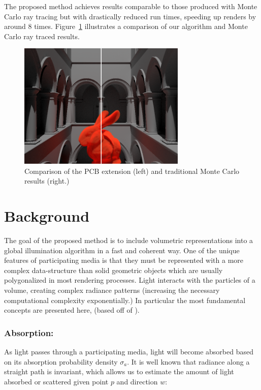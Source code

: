 \documentclass[runningheads]{llncs}
\begin{document}
  The proposed method achieves results comparable to those produced with Monte Carlo ray tracing but with drastically reduced run times, speeding up renders by around 8 times.  Figure~\ref{fig:compare} illustrates a comparison of our algorithm and Monte Carlo ray traced results.

\begin{figure}[h!]
    \centering
    \includegraphics[width=80mm]{img/compare.png}
    \caption{Comparison of the PCB extension (left) and traditional Monte Carlo results (right.)}
    \label{fig:compare}
\end{figure}


\section{Background}
\label{background_sec}
The goal of the proposed method is to include volumetric representations into a global illumination algorithm in a fast and coherent way. One of the unique features of participating media is that they must be represented with a more complex data-structure than solid geometric objects which are usually polygonalized in most rendering processes.  Light interacts with the particles of a volume, creating complex radiance patterns (increasing the necessary computational complexity exponentially.) In particular the most fundamental concepts are presented here,  (based off of  \cite{pbrt}).

\subsubsection{Absorption:}
As light passes through a participating media, light will become absorbed based on its absorption probability density $\sigma_{a}$. It is well known that radiance along a straight path is invariant, which allows us to estimate the amount of light absorbed or scattered given point $p$ and direction $w$:
\end{document}

